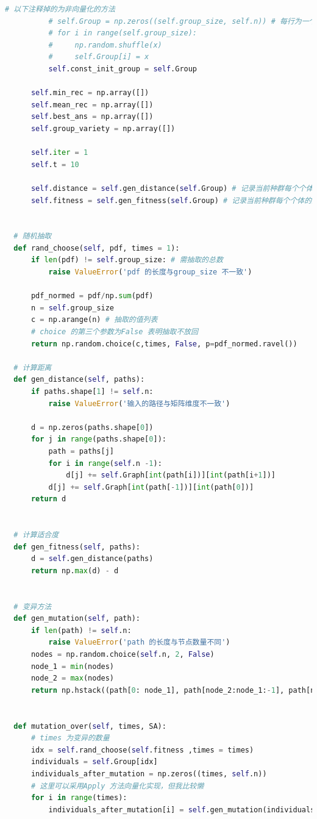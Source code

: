 \documentclass[12pt]{article}
\begin{document}
\begin{lstlisting}[language = Python, caption = GA算法计算TSP的类]
          # 以下注释掉的为非向量化的方法
          # self.Group = np.zeros((self.group_size, self.n)) # 每行为一个个体
          # for i in range(self.group_size):
          #     np.random.shuffle(x)
          #     self.Group[i] = x
          self.const_init_group = self.Group

      self.min_rec = np.array([])
      self.mean_rec = np.array([])
      self.best_ans = np.array([])
      self.group_variety = np.array([])

      self.iter = 1
      self.t = 10

      self.distance = self.gen_distance(self.Group) # 记录当前种群每个个体对应的距离
      self.fitness = self.gen_fitness(self.Group) # 记录当前种群每个个体的适合度


  # 随机抽取
  def rand_choose(self, pdf, times = 1):
      if len(pdf) != self.group_size: # 需抽取的总数
          raise ValueError('pdf 的长度与group_size 不一致')

      pdf_normed = pdf/np.sum(pdf)
      n = self.group_size
      c = np.arange(n) # 抽取的值列表
      # choice 的第三个参数为False 表明抽取不放回
      return np.random.choice(c,times, False, p=pdf_normed.ravel())  

  # 计算距离
  def gen_distance(self, paths):
      if paths.shape[1] != self.n:
          raise ValueError('输入的路径与矩阵维度不一致')

      d = np.zeros(paths.shape[0])
      for j in range(paths.shape[0]):
          path = paths[j]
          for i in range(self.n -1):
              d[j] += self.Graph[int(path[i])][int(path[i+1])]
          d[j] += self.Graph[int(path[-1])][int(path[0])]
      return d


  # 计算适合度
  def gen_fitness(self, paths):
      d = self.gen_distance(paths)
      return np.max(d) - d 


  # 变异方法
  def gen_mutation(self, path):
      if len(path) != self.n:
          raise ValueError('path 的长度与节点数量不同')
      nodes = np.random.choice(self.n, 2, False)
      node_1 = min(nodes)
      node_2 = max(nodes)
      return np.hstack((path[0: node_1], path[node_2:node_1:-1], path[node_1:node_1 + 1], path[node_2 + 1:]))


  def mutation_over(self, times, SA):
      # times 为变异的数量
      idx = self.rand_choose(self.fitness ,times = times)
      individuals = self.Group[idx]
      individuals_after_mutation = np.zeros((times, self.n))
      # 这里可以采用Apply 方法向量化实现，但我比较懒
      for i in range(times):
          individuals_after_mutation[i] = self.gen_mutation(individuals[i])
      

\end{lstlisting}
\end{document}
